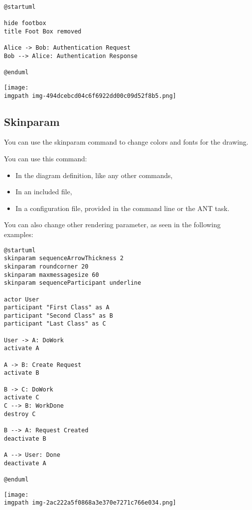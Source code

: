 \begin{verbatim}
@startuml

hide footbox
title Foot Box removed

Alice -> Bob: Authentication Request
Bob --> Alice: Authentication Response

@enduml
\end{verbatim}
\begin{center}
\texttt{[image: \\imgpath img-494dcebcd04c6f6922dd00c09d52f8b5.png]}
\end{center}


%
%
\subsection{Skinparam}




You can use the skinparam
command to change colors and fonts for the drawing.




You can use this command:
\begin{itemize}
\item In the diagram definition, like any other commands,
\item In an included file,
\item In a configuration file, provided in the command line or the ANT task.
\end{itemize}


You can also change other rendering parameter, as seen in the following examples:


\begin{verbatim}
@startuml
skinparam sequenceArrowThickness 2
skinparam roundcorner 20
skinparam maxmessagesize 60
skinparam sequenceParticipant underline

actor User
participant "First Class" as A
participant "Second Class" as B
participant "Last Class" as C

User -> A: DoWork
activate A

A -> B: Create Request
activate B

B -> C: DoWork
activate C
C --> B: WorkDone
destroy C

B --> A: Request Created
deactivate B

A --> User: Done
deactivate A

@enduml
\end{verbatim}
\begin{center}
\texttt{[image: \\imgpath img-2ac222a5f0868a3e370e7271c766e034.png]}
\end{center}


